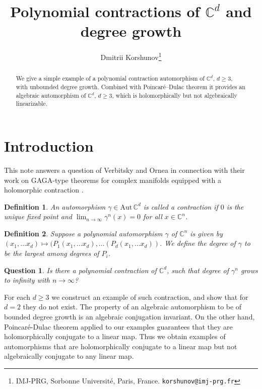 \documentclass[12pt]{article}
\title{Polynomial contractions of $\mathbb C^d $ and degree growth}
\author{
Dmitrii Korshunov\thanks{%
IMJ-PRG, Sorbonne Université, Paris, France.
\texttt{korshunov@imj-prg.fr}}
}
\newtheorem{definition}{Definition}
\newtheorem{question}{Question}
\newcommand{\aut}{\mathrm{Aut\,}}
\begin{document}
\maketitle

\begin{abstract}
 We give a simple example of a polynomial contraction automorphism of $\mathbb C^d$, $ d\ge 3 $, with unbounded degree growth. Combined with Poincar\'e--Dulac theorem it provides an algebraic automorphism of $\mathbb C^d$, $ d\ge 3 $, which is holomorphically but not algebraically linearizable.
\end{abstract}


\section{Introduction}

This note answers a question of Verbitsky and Ornea in connection with their work on GAGA-type theorems for complex manifolds equipped with a holomorphic contraction \cite{OV}.



\begin{definition}
An automorphism $\gamma\in \aut\mathbb C^d$ is called a contraction if $ 0 $ is the unique fixed point and  $\lim_{n\to \infty}\gamma^n(x)=0$ for all $x\in \mathbb C^n$.
\end{definition}


\begin{definition}
Suppose a polynomial automorphism $ \gamma $ of $ \mathbb C^n $ is given by \\  $(x_1,\dots x_d)\mapsto (P_1(x_1,\dots x_d),\dots (P_d(x_1,\dots x_d))$. We define the degree of $ \gamma $ to be the largest among degrees of $ P_i $.
\end{definition}


\begin{question}
Is there a polynomial contraction of $ \mathbb C^d $, such that degree of $\gamma^n$ grows to infinity with $ n\to\infty $?
\end{question}

For each $ d\ge 3 $ we construct an example of such contraction, and  show that for $ d= 2 $ they do not exist. The property of an algebraic automorphism to be of bounded degree growth is an algebraic conjugation invariant. On the other hand, Poincar\'e-Dulac theorem applied to our examples guarantees that they are holomorphically conjugate to a linear map. Thus we obtain examples of automorphisms that are holomorphically conjugate to a linear map but not algebraically conjugate to any linear map.
\end{document}
